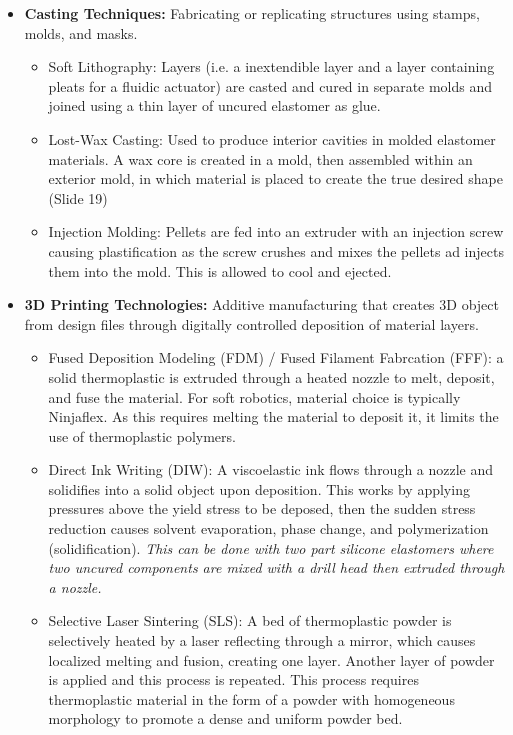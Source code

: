 \documentclass[onecolumn,a4paper]{article}
\begin{document}
\begin{itemize}
    \item \textbf{Casting Techniques:} Fabricating or replicating structures using stamps, molds, and masks.
    \begin{itemize}
        \item Soft Lithography: Layers (i.e. a inextendible layer and a layer containing pleats for a fluidic actuator) are casted and cured in separate molds and joined using a thin layer of uncured elastomer as glue.
        \item Lost-Wax Casting: Used to produce interior cavities in molded elastomer materials. A wax core is created in a mold, then assembled within an exterior mold, in which material is placed to create the true desired shape (Slide 19)
        \item Injection Molding: Pellets are fed into an extruder with an injection screw causing plastification as the screw crushes and mixes the pellets ad injects them into the mold. This is allowed to cool and ejected.
    \end{itemize}
    \item \textbf{3D Printing Technologies:} Additive manufacturing that creates 3D object from design files through digitally controlled deposition of material layers.
    \begin{itemize}
        \item Fused Deposition Modeling (FDM) / Fused Filament Fabrcation (FFF): a solid thermoplastic is extruded through a heated nozzle to melt, deposit, and fuse the material. For soft robotics, material choice is typically Ninjaflex. As this requires melting the material to deposit it, it limits  the use of thermoplastic polymers.
        \item Direct Ink Writing (DIW): A viscoelastic ink flows through a nozzle and solidifies into a solid object upon deposition. This works by applying pressures above the yield stress to be deposed, then the sudden stress reduction causes solvent evaporation, phase change, and polymerization (solidification). \emph{This can be done with two part silicone elastomers where two uncured components are mixed with a drill head then extruded through a nozzle.} 
        \item Selective Laser Sintering (SLS): A bed of thermoplastic powder is selectively heated by a laser reflecting through a mirror, which causes localized melting and fusion, creating one layer. Another layer of powder is applied and this process is repeated. This process requires thermoplastic material in the form of a powder with homogeneous morphology to promote a dense and uniform powder bed.

\end{itemize}
\end{itemize}
\end{document}
